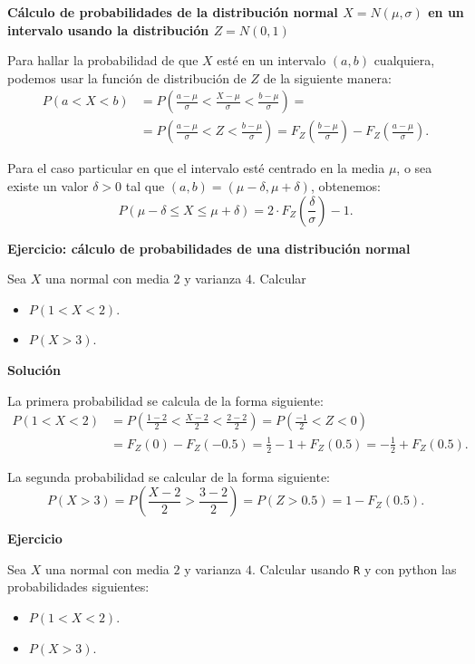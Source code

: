 \documentclass[]{book}
\providecommand{\tightlist}{%
  \setlength{\itemsep}{0pt}\setlength{\parskip}{0pt}}
\begin{document}
\textbf{Cálculo de probabilidades de la distribución normal \(X=N(\mu,\sigma)\) en un intervalo usando la distribución \(Z=N(0,1)\)}

Para hallar la probabilidad de que \(X\) esté en un intervalo \((a,b)\) cualquiera, podemos usar la función de distribución de \(Z\) de la siguiente manera:
\[
\begin{array}{ll}
P(a<X<b)&=P\left(\frac{a-\mu}{\sigma}<\frac{X-\mu}{\sigma}<\frac{b-\mu}{\sigma}\right)= \\
&=P\left(\frac{a-\mu}{\sigma}<Z<\frac{b-\mu}{\sigma}\right)=F_{Z}\left(\frac{b-\mu}{\sigma}\right)-
F_{Z}\left(\frac{a-\mu}{\sigma}\right).
\end{array}
\]

Para el caso particular en que el intervalo esté centrado en la media \(\mu\), o sea existe un valor \(\delta>0\) tal que \((a,b)=(\mu-\delta,\mu+\delta)\), obtenemos:
\[
P\left(\mu-\delta\leq X \leq\mu+\delta\right)=2\cdot  F_Z\left(\frac{\delta}{\sigma}\right)-1.
\]

\textbf{Ejercicio: cálculo de probabilidades de una distribución normal}

Sea \(X\) una normal con media \(2\) y varianza \(4\). Calcular

\begin{itemize}
\tightlist
\item
  \(P(1< X< 2).\)
\item
  \(P(X>3).\)
\end{itemize}

\textbf{Solución}

La primera probabilidad se calcula de la forma siguiente:
\[
\begin{array}{ll}
P(1< X< 2)&= P\left(\frac{1-2}{2}<\frac{X-2}{2}<\frac{2-2}{2}\right)= P\left(\frac{-1}{2}<Z<0\right)\\
&= F_{Z}(0)-F_{Z}(-0.5)=\frac12-1+F_{Z}(0.5)=-\frac12+F_Z(0.5).
\end{array}
\]

La segunda probabilidad se calcular de la forma siguiente:
\[
P(X>3)=P\left(\frac{X-2}2>\frac{3-2}{2}\right)=P(Z>0.5)=1-F_{Z}(0.5).
\]

\textbf{Ejercicio}

Sea \(X\) una normal con media \(2\) y varianza \(4\). Calcular usando \texttt{R} y con python las probabilidades siguientes:

\begin{itemize}
\tightlist
\item
  \(P(1< X< 2).\)
\item
  \(P(X>3).\)
\end{itemize}
\end{document}
